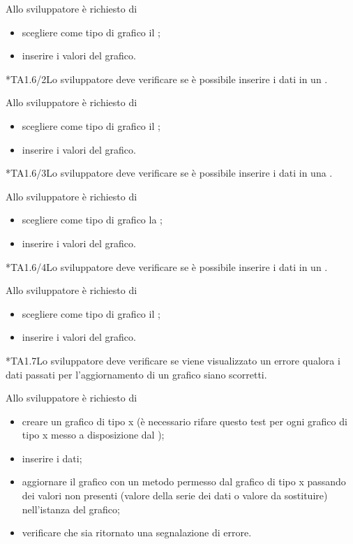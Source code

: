 		Allo sviluppatore è richiesto di
		\begin{itemize}
			\item scegliere come tipo di grafico il ;
			\item inserire i valori del grafico.
		\end{itemize}	
			
	*{TA1.6/2}Lo sviluppatore deve verificare se è possibile inserire i dati in un .

		Allo sviluppatore è richiesto di
		\begin{itemize}
			\item scegliere come tipo di grafico il ;
			\item inserire i valori del grafico.
		\end{itemize}	

	*{TA1.6/3}Lo sviluppatore deve verificare se è possibile inserire i dati in una .

		Allo sviluppatore è richiesto di
		\begin{itemize}
			\item scegliere come tipo di grafico la ;
			\item inserire i valori del grafico.
		\end{itemize}	

	*{TA1.6/4}Lo sviluppatore deve verificare se è possibile inserire i dati in un .

		Allo sviluppatore è richiesto di
		\begin{itemize}
			\item scegliere come tipo di grafico il ;
			\item inserire i valori del grafico.
		\end{itemize}

	*{TA1.7}Lo sviluppatore deve verificare se viene visualizzato un errore qualora i dati passati per l'aggiornamento di un grafico siano scorretti.

		Allo sviluppatore è richiesto di
		\begin{itemize}
			\item creare un grafico di tipo x (è necessario rifare questo test per ogni grafico di tipo x messo a disposizione dal );
			\item inserire i dati;
			\item aggiornare il grafico con un metodo permesso dal grafico  di tipo x passando dei valori non presenti (valore della serie dei dati o valore da sostituire) nell'istanza del grafico;
			\item verificare che sia ritornato una segnalazione di errore.
		\end{itemize}


